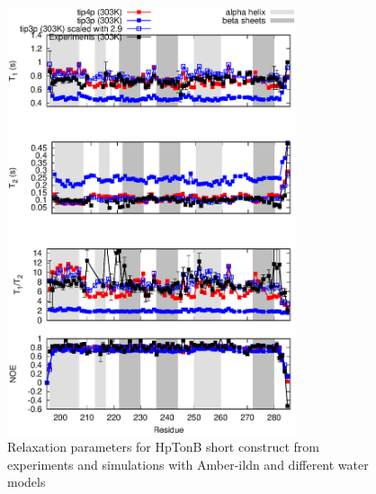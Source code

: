 \documentclass[pre,aps,floatfix,authordate1-4,twocolumn]{revtex4-1}
\begin{document}
\begin{figure}[!h]
  \includegraphics[width=8.5cm]{../Figs/HpTonBrelaxationDATAscaled.eps}%
  \caption{Relaxation parameters for HpTonB short construct from
    experiments and simulations with Amber-ildn and different water models
    \label{HpTonBrelaxationDATAscaled}}%
\end{figure}
\end{document}
